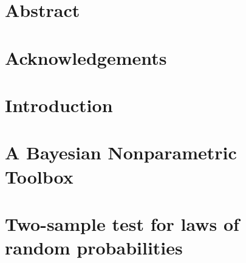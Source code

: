 \documentclass[
  a4paper,
  12pt,
  twoside,
  openright
]{book}
\begin{document}

\frontmatter  %

\makefrontpage

\chapter*{Abstract}


\chapter*{Acknowledgements}


\tableofcontents

\mainmatter   %

\chapter{Introduction}


\chapter{A Bayesian Nonparametric Toolbox}






\chapter{Two-sample test for laws of random probabilities}






\end{document}
